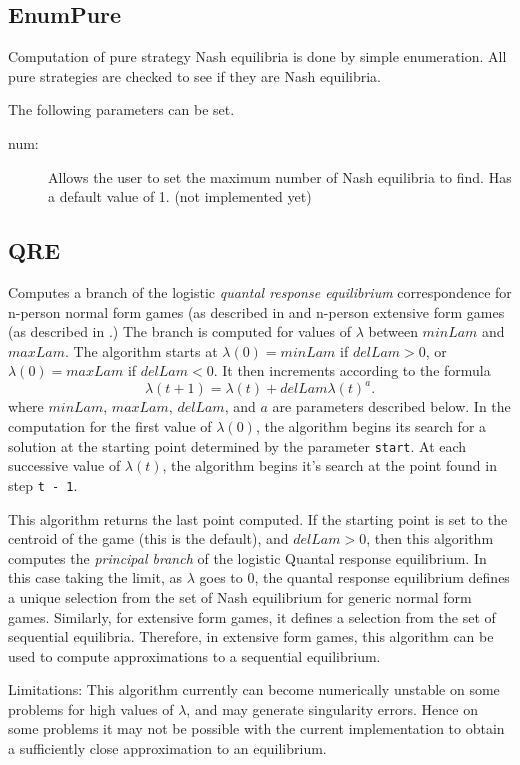 {\subsection{EnumPure}\label{EnumPure}
Computation of pure strategy Nash equilibria is done by simple enumeration.
All pure strategies are checked to see if they are Nash equilibria.  

The following parameters can be set. 

\begin{description}
\item[num:] Allows the user to set the maximum number of Nash equilibria to
find.  Has a default value of 1. (not implemented yet) 
\end{description}


\subsection{QRE}\label{QRE}
Computes a branch of the logistic {\em quantal response equilibrium} 
correspondence for n-person normal form games (as described 
in \cite{McKPal:95a}  and n-person extensive form games (as described 
in \cite{McKPal:95b}.) The branch is computed 
for values of $\lambda$ between $minLam$ and $maxLam$.  The algorithm 
starts at $\lambda(0) = minLam$ if $delLam > 0$, or 
$\lambda(0) = maxLam$ if 
$delLam < 0$. It then increments according to the formula 
$$
\lambda(t+1) = \lambda(t) +delLam \lambda(t)^a.
$$
where $minLam$, $maxLam$, $delLam$, and $a$ are
parameters described below. In the computation for the first value of
$\lambda(0)$, the algorithm begins its search for a solution at the
starting point determined by the parameter \verb+start+.  At each
successive value of $\lambda(t)$, the algorithm begins it's search at
the point found in step \verb+t - 1+.  

This algorithm returns the last point computed.  
If the starting point is set to the centroid of the game (this is the
default), and $delLam > 0$, then this algorithm computes the {\em principal
branch} of the logistic Quantal response equilibrium.  In this case
taking the limit, as $\lambda$ goes to 0, the quantal response equilibrium
defines a unique selection from the set of Nash equilibrium for generic
normal form games.  Similarly, for extensive form games, it
defines a selection from the set of sequential equilibria.
Therefore, in extensive form games, this algorithm can be used to compute
approximations to a sequential equilibrium.

Limitations:  This algorithm currently can become numerically unstable 
on some problems for high values of $\lambda$, and may generate 
singularity errors.  Hence 
on some problems it may not be possible with the current
implementation to obtain a sufficiently close approximation to an
equilibrium. 

}
